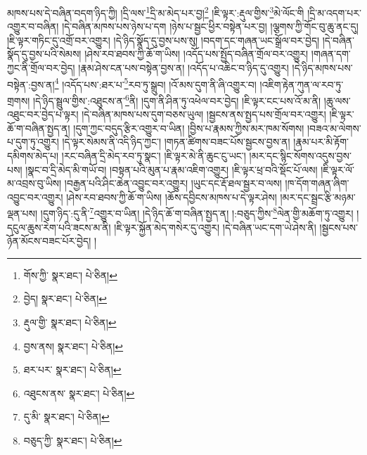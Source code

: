 མཁས་པས་དེ་བཞིན་བདག་ཉིད་ཀྱི། །དྲི་ལས་\footnote{གོས་ཀྱི་  སྣར་ཐང་།  པེ་ཅིན། }དྲི་མ་མེད་པར་བྱ།\footnote{བྱེད།  སྣར་ཐང་།  པེ་ཅིན། } །ཇི་ལྟར་:རྡུལ་གྱིས་\footnote{རྡུལ་གྱི་  སྣར་ཐང་།  པེ་ཅིན། }མེ་ལོང་གི །དྲི་མ་འདག་པར་འགྱུར་བ་བཞིན། །དེ་བཞིན་མཁས་པས་ཉེས་པ་དག །ཉེས་པ་སྦྱང་ཕྱིར་བསྟེན་པར་བྱ། །ལྕགས་ཀྱི་གོང་བུ་ཆུ་ནང་དུ། །ཇི་ལྟར་གཏིང་དུ་འགྲོ་བར་འགྱུར། །དེ་ཉིད་སྣོད་དུ་བྱས་པས་སུ། །བདག་དང་གཞན་ཡང་སྒྲོལ་བར་བྱེད། །དེ་བཞིན་སྣོད་དུ་བྱས་པའི་སེམས། །ཤེས་རབ་ཐབས་ཀྱི་ཆོ་ག་ཡིས། །འདོད་པས་སྤྱོད་བཞིན་གྲོལ་བར་འགྱུར། །གཞན་དག་ཀྱང་ནི་གྲོལ་བར་བྱེད། །རྣམ་ཤེས་ངན་པས་བསྟེན་བྱས་ན། །འདོད་པ་འཆིང་བ་ཉིད་དུ་འགྱུར། །དེ་ཉིད་མཁས་པས་བསྟེན་:བྱས་ན།\footnote{བྱས་ནས།  སྣར་ཐང་།  པེ་ཅིན། } །འདོད་པས་:ཐར་པ་\footnote{ཐར་པར་  སྣར་ཐང་།  པེ་ཅིན། }རབ་ཏུ་སྒྲུབ། །འོ་མས་དུག་ནི་ཞི་འགྱུར་བ། །འཇིག་རྟེན་ཀུན་ལ་རབ་ཏུ་གྲགས། །དེ་ཉིད་སྦྲུལ་གྱིས་:འཐུངས་ན་\footnote{འཐུངས་ནས་  སྣར་ཐང་།  པེ་ཅིན། }ནི། །དུག་ནི་ཤིན་ཏུ་འཕེལ་བར་བྱེད། །ཇི་ལྟར་ངང་པས་འོ་མ་ནི། །ཆུ་ལས་འཐུང་བར་བྱེད་པ་ལྟར། །དེ་བཞིན་མཁས་པས་དུག་བཅས་ཡུལ། །སྦྱངས་ནས་སྤྱད་པས་གྲོལ་བར་འགྱུར། །ཇི་ལྟར་ཆོ་ག་བཞིན་སྤྱད་ན། །དུག་ཀྱང་བདུད་རྩིར་འགྱུར་བ་ཡིན། །བྱིས་པ་རྣམས་ཀྱིས་མར་ཁམ་སོགས། །བཟའ་མ་ལེགས་པ་དུག་ཏུ་འགྱུར། །དེ་ལྟར་སེམས་ནི་འདི་ཉིད་ཀྱང་། །གཏན་ཚིགས་བཟང་པོས་སྦྱངས་བྱས་ན། །རྣམ་པར་མི་རྟོག་དམིགས་མེད་པ། །རང་བཞིན་དྲི་མེད་རབ་ཏུ་སྣང་། །ཇི་ལྟར་མེ་ནི་ཆུང་ངུ་ཡང་། །མར་དང་སྙིང་སོགས་འདུས་བྱས་པས། །སྣང་བ་དྲི་མེད་མི་གཡོ་བ། །བསྟན་པའི་མུན་པ་རྣམ་འཇིག་འགྱུར། །ཇི་ལྟར་ཕྲ་བའི་སྡོང་པོ་ལས། །ཇི་ལྟར་ལོ་མ་འབྲས་བུ་ཡིས། །བརྒྱན་པའི་ཤིང་ཆེན་འབྱུང་བར་འགྱུར། །ཡུང་དང་རྡོ་ཐལ་སྦྱར་བ་ལས། །ཁ་དོག་གཞན་ཞིག་འབྱུང་བར་འགྱུར། །ཤེས་རབ་ཐབས་ཀྱི་ཆོ་ག་ཡིས། །ཆོས་དབྱིངས་མཁས་པ་དེ་ལྟར་ཤེས། །མར་དང་སྦྲང་རྩི་མཉམ་ལྡན་པས། །དུག་ཉིད་:དུ་ནི་\footnote{དུ་མི་  སྣར་ཐང་།  པེ་ཅིན། }འགྱུར་བ་ཡིན། །དེ་ཉིད་ཆོ་ག་བཞིན་སྤྱད་ན། །:བཅུད་ཀྱིས་\footnote{བཅུད་ཀྱི་  སྣར་ཐང་།  པེ་ཅིན། }ལེན་གྱི་མཆོག་ཏུ་འགྱུར། །དངུལ་ཆུས་རེག་པའི་ཟངས་མ་ནི། །ཇི་ལྟར་སྐྱོན་མེད་གསེར་དུ་འགྱུར། །དེ་བཞིན་ཡང་དག་ཡེ་ཤེས་ནི། །སྦྱངས་པས་ཉོན་མོངས་བཟང་པོར་བྱེད། །

